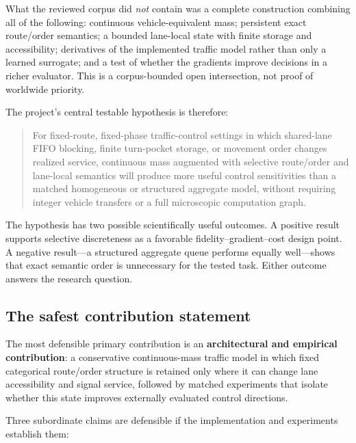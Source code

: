 \documentclass[11pt,a4paper]{article}
\begin{document}
What the reviewed corpus did \emph{not} contain was a complete construction combining all of the following: continuous vehicle-equivalent mass; persistent exact route/order semantics; a bounded lane-local state with finite storage and accessibility; derivatives of the implemented traffic model rather than only a learned surrogate; and a test of whether the gradients improve decisions in a richer evaluator. This is a corpus-bounded open intersection, not proof of worldwide priority.

The project's central testable hypothesis is therefore:

\begin{quote}
For fixed-route, fixed-phase traffic-control settings in which shared-lane FIFO blocking, finite turn-pocket storage, or movement order changes realized service, continuous mass augmented with selective route/order and lane-local semantics will produce more useful control sensitivities than a matched homogeneous or structured aggregate model, without requiring integer vehicle transfers or a full microscopic computation graph.
\end{quote}

The hypothesis has two possible scientifically useful outcomes. A positive result supports selective discreteness as a favorable fidelity--gradient--cost design point. A negative result---a structured aggregate queue performs equally well---shows that exact semantic order is unnecessary for the tested task. Either outcome answers the research question.

\subsection{The safest contribution statement}

The most defensible primary contribution is an \textbf{architectural and empirical contribution}: a conservative continuous-mass traffic model in which fixed categorical route/order structure is retained only where it can change lane accessibility and signal service, followed by matched experiments that isolate whether this state improves externally evaluated control directions.

Three subordinate claims are defensible if the implementation and experiments establish them:
\end{document}
